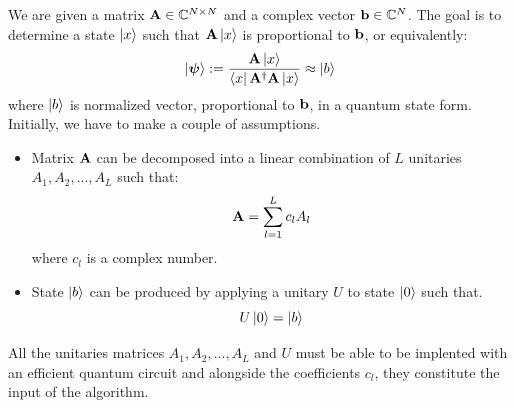 \documentclass[12pt]{article}
\begin{document}
We are given a matrix ${\bf A} \in \mathbb{C}^{N\times N}$ and a complex vector ${\bf b} \in \mathbb{C}^N $.
 The goal is to determine a state $\left\vert{x}\right\rangle$ such that ${\bf A}\left\vert{x}\right\rangle$ is proportional to ${\bf b}$, or equivalently:
$$\left\vert{\boldsymbol \psi}\right\rangle := \frac{{\bf A}\left\vert{x}\right\rangle}{\left\langle{x}\right\vert{\bf A}^\dag {\bf A}\left\vert{x}\right\rangle} \approx \left\vert{b}\right\rangle $$
where $\left\vert{b}\right\rangle$ is normalized vector, proportional to $\bf b$, in a quantum state form. 
Initially, we have to make a couple of assumptions. 
\begin{itemize}
   \item Matrix ${\bf A}$ can be decomposed into a linear combination of $L$ unitaries $A_1,A_2,...,A_{L}$
such that:
$${\bf A} = \sum_{l = 1}^{L}c_lA_l$$
where $c_l$ is a complex number. 
\item State $\left\vert{b}\right\rangle$ can be produced by applying a unitary $U$ to state $\left\vert{0}\right\rangle$ such that.
$$U\left\vert{0}\right\rangle = \left\vert{b}\right\rangle$$
\end{itemize}
All the unitaries matrices $A_1,A_2,...,A_L$ and $U$ must be able to be implented with an efficient quantum circuit
and alongside the coefficients $c_l$, they constitute the input of the algorithm.\\
\end{document}

